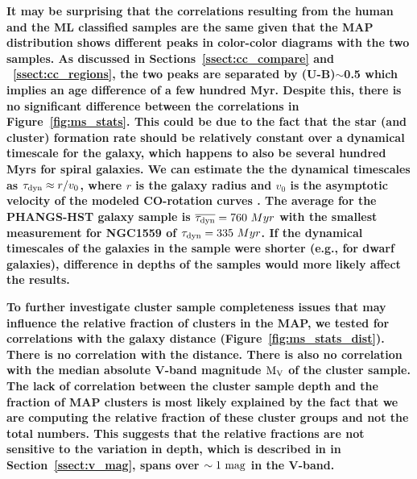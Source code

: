 \documentclass[linenumbers]{aastex63}
\begin{document}
\textbf{It may be surprising that the correlations resulting from the human and the ML classified samples are the same given that the MAP distribution shows different peaks in color-color diagrams with the two samples.  As discussed in Sections~\ref{ssect:cc_compare} and  ~\ref{ssect:cc_regions}, the two peaks are separated by (U-B)$\sim$0.5 which implies an age difference of a few hundred Myr.  Despite this, there is no significant difference between the correlations in Figure~\ref{fig:ms_stats}.  This could be due to the fact that the star (and cluster) formation rate should be relatively constant over a dynamical timescale for the galaxy, which happens to also be several hundred Myrs for spiral galaxies.
We can estimate the the dynamical timescales as $\tau_{\rm dyn} \approx r / v_0$, where $r$ is the galaxy radius and $v_0$ is the asymptotic velocity of the modeled CO-rotation curves \citep{lang_phangs_2020}. The average for the PHANGS-HST galaxy sample is $\overline{\tau_{\rm dyn}} = 760~{Myr}$ with the smallest measurement for NGC1559 of $\tau_{\rm dyn}=335~{Myr}$. 
If the dynamical timescales of the galaxies in the sample were shorter (e.g., for dwarf galaxies), difference in depths of the samples would more likely affect the results.}



\textbf{
To further investigate cluster sample completeness issues that may influence the relative fraction of clusters in the MAP, we tested for correlations with the galaxy distance (Figure~\ref{fig:ms_stats_dist}). There is no correlation with the distance. 
There is also no correlation with the median absolute V-band magnitude ${\rm M_V}$ of the cluster sample. 
The lack of correlation between the cluster sample depth and the fraction of MAP clusters is most likely explained by the fact that we are computing the relative fraction of these cluster groups and not the total numbers. 
This suggests that the relative fractions are not sensitive to the variation in depth, which is described in in Section~\ref{ssect:v_mag}, spans over $\sim 1~{\rm mag}$ in the V-band.} 

\end{document}
